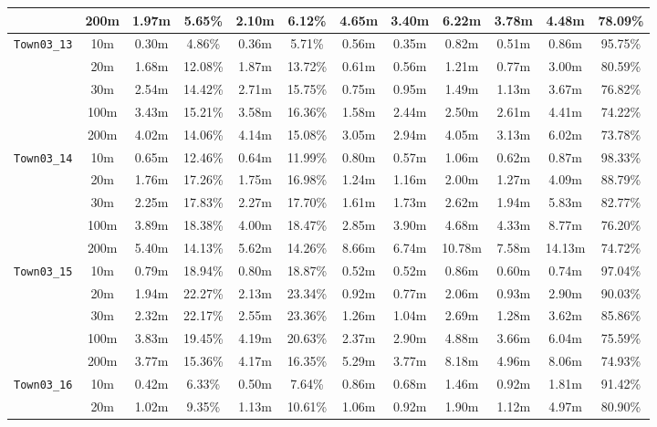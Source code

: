 \begin{table}
{\begin{tabular}{@{}cccccccccccc@{}}
      & 200m & 1.97m & 5.65\% & 2.10m & 6.12\% & 4.65m & 3.40m & 6.22m & 3.78m & 4.48m & 78.09\% \\
      \midrule
      \multirow{5}{*}{\Verb|Town03_13|} & 10m & 0.30m & 4.86\% & 0.36m & 5.71\% & 0.56m & 0.35m & 0.82m & 0.51m & 0.86m & 95.75\% \\
      & 20m & 1.68m & 12.08\% & 1.87m & 13.72\% & 0.61m & 0.56m & 1.21m & 0.77m & 3.00m & 80.59\% \\
      & 30m & 2.54m & 14.42\% & 2.71m & 15.75\% & 0.75m & 0.95m & 1.49m & 1.13m & 3.67m & 76.82\% \\
      & 100m & 3.43m & 15.21\% & 3.58m & 16.36\% & 1.58m & 2.44m & 2.50m & 2.61m & 4.41m & 74.22\% \\
      & 200m & 4.02m & 14.06\% & 4.14m & 15.08\% & 3.05m & 2.94m & 4.05m & 3.13m & 6.02m & 73.78\% \\
      \midrule
      \multirow{5}{*}{\Verb|Town03_14|} & 10m & 0.65m & 12.46\% & 0.64m & 11.99\% & 0.80m & 0.57m & 1.06m & 0.62m & 0.87m & 98.33\% \\
      & 20m & 1.76m & 17.26\% & 1.75m & 16.98\% & 1.24m & 1.16m & 2.00m & 1.27m & 4.09m & 88.79\% \\
      & 30m & 2.25m & 17.83\% & 2.27m & 17.70\% & 1.61m & 1.73m & 2.62m & 1.94m & 5.83m & 82.77\% \\
      & 100m & 3.89m & 18.38\% & 4.00m & 18.47\% & 2.85m & 3.90m & 4.68m & 4.33m & 8.77m & 76.20\% \\
      & 200m & 5.40m & 14.13\% & 5.62m & 14.26\% & 8.66m & 6.74m & 10.78m & 7.58m & 14.13m & 74.72\% \\
      \midrule
      \multirow{5}{*}{\Verb|Town03_15|} & 10m & 0.79m & 18.94\% & 0.80m & 18.87\% & 0.52m & 0.52m & 0.86m & 0.60m & 0.74m & 97.04\% \\
      & 20m & 1.94m & 22.27\% & 2.13m & 23.34\% & 0.92m & 0.77m & 2.06m & 0.93m & 2.90m & 90.03\% \\
      & 30m & 2.32m & 22.17\% & 2.55m & 23.36\% & 1.26m & 1.04m & 2.69m & 1.28m & 3.62m & 85.86\% \\
      & 100m & 3.83m & 19.45\% & 4.19m & 20.63\% & 2.37m & 2.90m & 4.88m & 3.66m & 6.04m & 75.59\% \\
      & 200m & 3.77m & 15.36\% & 4.17m & 16.35\% & 5.29m & 3.77m & 8.18m & 4.96m & 8.06m & 74.93\% \\
      \midrule
      \multirow{5}{*}{\Verb|Town03_16|} & 10m & 0.42m & 6.33\% & 0.50m & 7.64\% & 0.86m & 0.68m & 1.46m & 0.92m & 1.81m & 91.42\% \\
      & 20m & 1.02m & 9.35\% & 1.13m & 10.61\% & 1.06m & 0.92m & 1.90m & 1.12m & 4.97m & 80.90\% \\

\end{tabular}}
\end{table}
